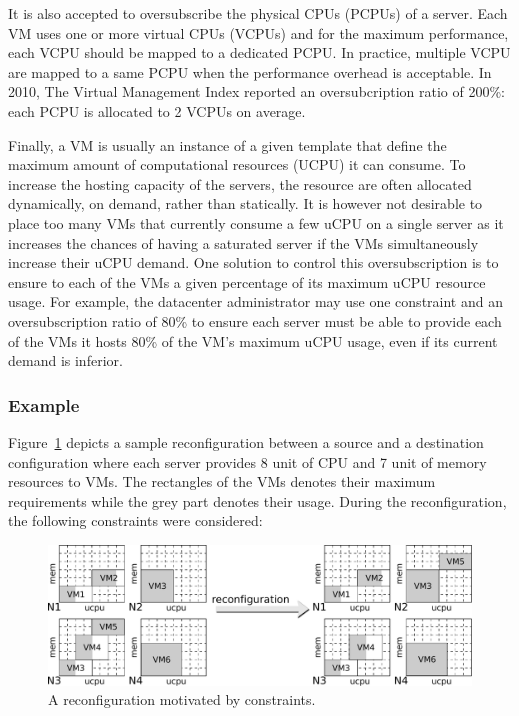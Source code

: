 It is also accepted to oversubscribe the physical CPUs (PCPUs) of a server. Each VM uses one or more virtual CPUs (VCPUs) and for the maximum performance, each VCPU should be mapped to a dedicated PCPU. In practice, multiple VCPU are mapped to a same PCPU when the performance overhead is acceptable.
In 2010, The Virtual Management Index reported an oversubcription ratio of 200\%: each PCPU is allocated to 2 VCPUs on average.~\cite{vmi}

Finally, a VM is usually an instance of a given template that define the maximum amount of computational resources (UCPU) it can consume. To increase the hosting capacity of the servers, the resource are often allocated dynamically, on demand,
rather than statically\cite{pMapper,violin,bobroff2007dynamic,entropy-vee09}. It is however not desirable to place too many VMs that currently consume a few uCPU on a single server as it increases the chances of having a saturated server if the VMs simultaneously increase their uCPU demand. One solution to control this oversubscription is to ensure to each of the VMs a given percentage of its maximum uCPU resource usage. For example, the datacenter administrator may use one  constraint and an oversubscription ratio of 80\% to ensure each server must be able to provide each of the VMs it hosts 80\% of the VM's maximum uCPU usage, even if its current demand is inferior. 

\subsubsection{Example}

Figure~\ref{fig: oversubscription} depicts a sample reconfiguration between a source and a destination configuration where each server provides 8 unit of CPU and 7 unit of memory resources to VMs. The rectangles of the VMs denotes their maximum requirements while the grey part denotes their usage. During the reconfiguration, the following  constraints were considered:

\begin{figure}[htb]
\centering
\includegraphics[width=\textwidth]{img/oversubscription}
\caption{A reconfiguration motivated by  constraints.}\label{fig: oversubscription}
\end{figure}


